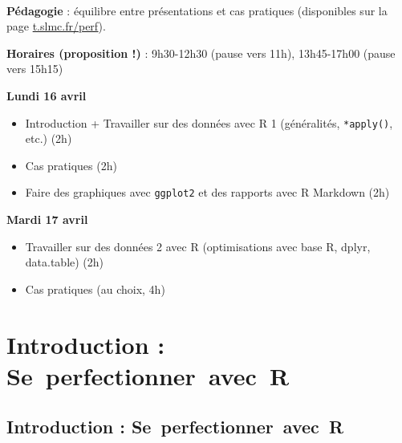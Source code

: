 \documentclass[12pt,ignorenonframetext,handout,]{beamer}
\newcommand{\intertitre}[1]{\textcolor{redInsee}{\textbf{#1}}}
\begin{document}
\begin{frame}[fragile]{~}
\protect\hypertarget{section-1}{}

\intertitre{Pédagogie} : équilibre entre présentations et cas pratiques
(disponibles sur la page \href{http://t.slmc.fr/perf}{t.slmc.fr/perf}).

\pause

\intertitre{Horaires (proposition !)} : 9h30-12h30 (pause vers 11h),
13h45-17h00 (pause vers 15h15)

\pause \bigskip

\intertitre{Lundi 16 avril}

\begin{itemize}
\item
  \vspace{-0.2cm}

  Introduction + Travailler sur des données avec R 1 (généralités,
  \texttt{*apply()}, etc.) (2h)
\item
  Cas pratiques (2h)
\item
  Faire des graphiques avec \texttt{ggplot2} et des rapports avec R
  Markdown (2h)
\end{itemize}

\pause

\intertitre{Mardi 17 avril}

\begin{itemize}
\item
  \vspace{-0.2cm}

  Travailler sur des données 2 avec R (optimisations avec base R, dplyr,
  data.table) (2h)
\item
  Cas pratiques (au choix, 4h)
\end{itemize}

\end{frame}

\hypertarget{introduction-seperfectionneravecr}{%
\section{Introduction :
Se~perfectionner~avec~R}\label{introduction-seperfectionneravecr}}

\subsection*{Introduction : Se\ perfectionner\ avec\ R}
\end{document}
